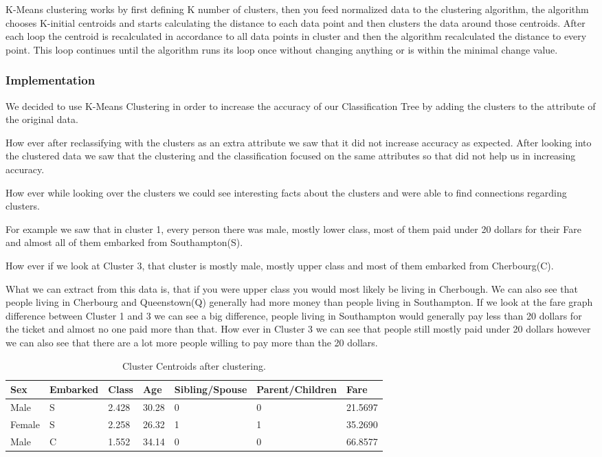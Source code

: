\documentclass[a4paper,11pt]{article}
\begin{document}
K-Means clustering\cite{KMeans} works by first defining K number of  clusters, then you feed normalized data to the clustering algorithm, the algorithm chooses K-initial centroids and starts calculating the distance to each data point and then clusters the data around those centroids. After each loop the centroid is recalculated in accordance to all data points in cluster and then the algorithm recalculated the distance to every point. This loop continues until the algorithm runs its loop once without changing anything or is within the minimal change value.
\subsubsection{Implementation}
We decided to use K-Means Clustering in order to increase the accuracy of our Classification Tree by adding the clusters to the attribute of the original data.

How ever after reclassifying with the clusters as an extra attribute we saw that it did not increase accuracy as expected. After looking into the clustered data we saw that the clustering and the classification focused on the same attributes so that did not help us in increasing accuracy.

How ever while looking over the clusters we could see interesting facts about the clusters and were able to find connections regarding clusters.

For example we saw that in cluster 1, every person there was male, mostly lower class, most of them paid under 20 dollars for their Fare and almost all of them embarked from Southampton(S).

How ever if we look at Cluster 3, that cluster is mostly male, mostly upper class and most of them embarked from Cherbourg(C).

What we can extract from this data is, that if you were upper class you would most likely be living in Cherbough.
We can also see that people living in Cherbourg and Queenstown(Q) generally had more money than people living in Southampton. If we look at the fare graph difference between Cluster 1 and 3 we can see a big difference, people living in Southampton would generally pay less than 20 dollars for the ticket and almost no one paid more than that. How ever in Cluster 3 we can see that people still mostly paid under 20 dollars however we can also see that there are a lot more people willing to pay more than the 20 dollars.

\begin{table}[h]
\begin{tabular}{|l|l|l|l|l|l|l|}
\hline
Sex & Embarked & Class & Age & Sibling/Spouse & Parent/Children & Fare\\
\hline
Male & S & 2.428 & 30.28 & 0 & 0 & 21.5697\\
Female & S & 2.258 & 26.32 & 1 & 1 & 35.2690\\
Male & C & 1.552 & 34.14 & 0 & 0 & 66.8577\\
\hline
\end{tabular}
\caption{Cluster Centroids after clustering.}
\label{clusterCentroids}
\end{table}
\end{document}
